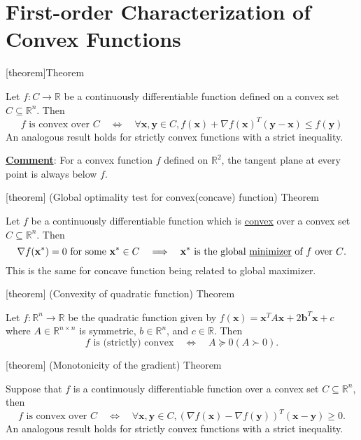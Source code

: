 \documentclass[12pt]{report}
\theoremstyle{definition}
\begin{document}
\section{First-order Characterization of Convex Functions}

[theorem]{Theorem}
\begin{gradient inequality}
    Let $f:C\rightarrow\mathbb{R}$ be a continuously differentiable function
    defined on a convex set $C\subseteq\mathbb{R}^{n}$. Then 
    \[
        f \text{ is convex over } C
        \quad\iff\quad
        \forall\mathbf{x},\mathbf{y}\in C,
        f(\mathbf{x})+\nabla f(\mathbf{x})^T(\mathbf{y}-\mathbf{x})\le
        f(\mathbf{y})
    \]
    An analogous result holds for strictly convex functions with a strict
    inequality.
\end{gradient inequality}
\underline{\textbf{Comment}}: For a convex function $f$ defined on
$\mathbb{R}^{2}$, the tangent plane at
every point is always below $f$.

[theorem]
{(Global optimality test for convex(concave) function) Theorem}
\begin{stationarity implies global optimality}
    Let $f$ be a continuously differentiable function which is
    \underline{convex} over a
    convex set $C\subseteq\mathbb{R}^{n}$. 
    Then
    \[
        \nabla f(\mathbf{x}^*)=0\text{ for some }\mathbf{x}^*\in C
        \quad\Longrightarrow\quad
        \mathbf{x}^*\text{ is the global \underline{minimizer} of $f$ over $C$.}
    \]
    This is the same for concave function being related to global maximizer.
\end{stationarity implies global optimality}

[theorem]
{(Convexity of quadratic function) Theorem}
\begin{convexity of quadratic function}
    Let $f:\mathbb{R}^{n}\rightarrow\mathbb{R}$ be the quadratic function given
    by $f(\mathbf{x})=\mathbf{x}^TA\mathbf{x}+2\mathbf{b}^T\mathbf{x}+c$ where
    $A\in\mathbb{R}^{n\times n}$ is symmetric, $b\in\mathbb{R}^{n}$, and
    $c\in\mathbb{R}$. Then
    \[
        f\text{ is (strictly) convex}
        \quad\iff\quad
        A\succeq 0(A\succ 0).
    \]
\end{convexity of quadratic function}

[theorem]
{(Monotonicity of the gradient) Theorem}
\begin{monotonicity of the gradient}
    Suppose that $f$ is a continuously differentiable function over a convex set
    $C\subseteq\mathbb{R}^{n}$, then
    \[
        f\text{ is convex over }C
        \quad\iff\quad
        \forall\mathbf{x},\mathbf{y}\in C,
        {(\nabla f(\mathbf{x})-\nabla
        f(\mathbf{y}))}^T(\mathbf{x}-\mathbf{y})\ge 0.
    \]
    An analogous result holds for strictly convex functions with a strict
    inequality.
\end{monotonicity of the gradient}
\end{document}
